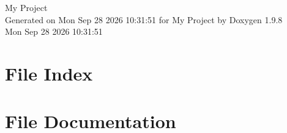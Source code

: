 \documentclass[twoside]{book}
\newcommand{\+}{\discretionary{\mbox{\scriptsize$\hookleftarrow$}}{}{}}
\newcommand{\clearemptydoublepage}{%
    \newpage{\pagestyle{empty}\cleardoublepage}%
  }
\begin{document}
  \raggedbottom
    \hypersetup{pageanchor=false,
                bookmarksnumbered=true,
                pdfencoding=unicode
               }
  \begin{titlepage}
  \vspace*{7cm}
  \begin{center}%
  {\Large My Project}\\
  \vspace*{1cm}
  {\large Generated on Mon Sep 28 2026 10\+:31\+:51 for My Project by Doxygen 1.9.8}\\
    \vspace*{0.5cm}
    {\small Mon Sep 28 2026 10:31:51}
  \end{center}
  \end{titlepage}
  \clearemptydoublepage
  \tableofcontents
  \clearemptydoublepage
  \hypersetup{pageanchor=true}

\chapter{File Index}

\chapter{File Documentation}


  \backmatter
  \newpage
  \clearemptydoublepage
  \printindex
\end{document}
